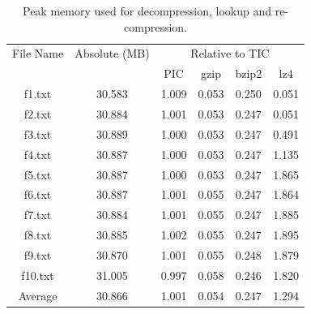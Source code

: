 \begin{table}[ht]
\centering
\begin{tabular}{cccccc}
\hline
File Name & Absolute (MB) & \multicolumn{4}{c}{Relative to TIC} \\
 &  & PIC & gzip & bzip2 & lz4 \\
\hline
f1.txt & 30.583 & 1.009 & 0.053 & 0.250 & 0.051 \\
f2.txt & 30.884 & 1.001 & 0.053 & 0.247 & 0.051 \\
f3.txt & 30.889 & 1.000 & 0.053 & 0.247 & 0.491 \\
f4.txt & 30.887 & 1.000 & 0.053 & 0.247 & 1.135 \\
f5.txt & 30.887 & 1.000 & 0.053 & 0.247 & 1.865 \\
f6.txt & 30.887 & 1.001 & 0.055 & 0.247 & 1.864 \\
f7.txt & 30.884 & 1.001 & 0.055 & 0.247 & 1.885 \\
f8.txt & 30.885 & 1.002 & 0.055 & 0.247 & 1.895 \\
f9.txt & 30.870 & 1.001 & 0.055 & 0.248 & 1.879 \\
f10.txt & 31.005 & 0.997 & 0.058 & 0.246 & 1.820 \\
Average & 30.866 & 1.001 & 0.054 & 0.247 & 1.294 \\
\hline
\end{tabular}
\caption{Peak memory used for decompression, lookup and re-compression.}
\label{tab:lookup_memory}
\end{table}

